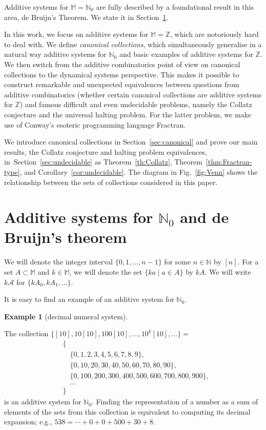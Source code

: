 \documentclass[12pt]{article}
\theoremstyle{definition}
\newtheorem{example}{Example}
\newcommand{\N}{\mathbb{N}}
\newcommand{\Z}{\mathbb{Z}}
\begin{document}
Additive systems for $\mathbb{M}=\N_0$ are fully described by a foundational result in this area, de Bruijn's Theorem. We state it in Section~\ref{sec:debr}.

In this work, we focus on additive systems for $\mathbb{M}=\Z$, which are notoriously hard to deal with. We define \emph{canonical collections}, which simultaneously generalise in a natural way additive systems for $\N_0$ and basic examples of additive systems for $\Z$. We then switch from the additive combinatorics point of view on canonical collections to the dynamical systems perspective. This makes it possible to construct remarkable and unexpected equivalences between questions from additive combinatorics (whether certain canonical collections are additive systems for $\Z$) and famous difficult and even undecidable problems, namely the Collatz conjecture and the universal halting problem. For the latter problem, we make use of Conway's esoteric programming language Fractran.

We introduce canonical collections in Section~\ref{sec:canonical} and prove our main results, the Collatz conjecture and halting problem equivalences, in~Section~\ref{sec:undecidable} as Theorem~\ref{th:Collatz}, Theorem~\ref{thm:Fractran-type}, and Corollary~\ref{cor:undecidable}. The diagram in Fig.~\ref{fig:Venn} shows the relationship between the sets of collections considered in this paper.


\section{Additive systems for $\N_0$ and de Bruijn's theorem}
\label{sec:debr}

We will denote the integer interval $\{0,1,\dotsc,n-1\}$ for some $n\in\N$ by $[n]$. For a set $A\subset\mathbb{M}$ and $k\in\mathbb{M}$, we will denote the set $\{ka \mid a\in A\}$ by $kA$. We will write $k\mathcal{A}$ for $\{kA_0, kA_1,\dotsc\}$.

It is easy to find an example of an additive system for $\N_0$.
\begin{example}[decimal numeral system]
\label{ex:decimal}~

The collection $\{[10],10[10],100[10],\dotsc,10^k[10],\dotsc\} =$
\[
\begin{aligned}
& \{ \\
&\quad \{0,1,2,3,4,5,6,7,8,9\}, \\
&\quad \{0,10,20,30,40,50,60,70,80,90\}, \\
&\quad \{0,100,200,300,400,500,600,700,800,900\}, \\[-0.2em]
&\quad ... \\[-0.5em]
& \}
\end{aligned}
\]
is an additive system for $\N_0$. Finding the representation of a number as a sum of elements of the sets from this collection is equivalent to computing its decimal expansion; e.g., $538 = \dotsb+0+0+500+30+8$.
\end{example}
\end{document}
